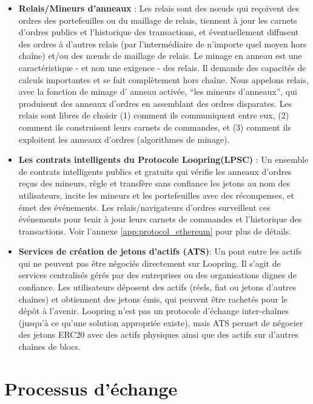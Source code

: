 \documentclass[UTF8,nofonts]{article}
\begin{document}
\begin{multicols}{2}
\begin{itemize}
\item \textbf{Relais/Mineurs d'anneaux} : Les relais sont des nœuds qui reçoivent des ordres des portefeuilles ou du maillage de relais, tiennent à jour les carnets d'ordres publics et l'historique des transactions, et éventuellement diffusent des ordres à d'autres relais (par l'intermédiaire de n’importe quel moyen hors chaîne) et/ou des nœuds de maillage de relais. Le minage en anneau est une caractéristique - et non une exigence - des relais. Il demande des capacités de calculs importantes et se fait complètement hors chaîne. Nous appelons relais, avec la fonction de minage d’ anneau activée, \enquote{les mineurs d’anneaux}, qui produisent des anneaux d'ordres en assemblant des ordres disparates. Les relais sont libres de choisir (1) comment ils communiquent entre eux, (2) comment ils construisent leurs carnets de commandes, et (3) comment ils exploitent les anneaux d'ordres (algorithmes de minage).

\item \textbf{Les contrats intelligents du Protocole Loopring(LPSC)} : Un ensemble de contrats intelligents publics et gratuits qui vérifie les anneaux d’ordres reçus des mineurs, règle et transfère sans confiance les jetons au nom des utilisateurs, incite les mineurs et les portefeuilles avec des récompenses, et émet des événements. Les relais/navigateurs d’ordres surveillent  ces événements pour tenir à jour leurs carnets de commandes et l'historique des transactions. Voir l'annexe \ref{app:protocol_ethereum} pour plus de détails.

\item \textbf{Services de création de jetons d'actifs (ATS)}: Un pont entre les actifs qui ne peuvent pas être négociés directement sur Loopring. Il s'agit de services centralisés gérés par des entreprises ou des organisations dignes de confiance. Les utilisateurs déposent des actifs (réels, fiat ou jetons d'autres chaînes) et obtiennent des jetons émis, qui peuvent être rachetés pour le dépôt à l'avenir. Loopring n'est pas un protocole d'échange inter-chaînes (jusqu'à ce qu'une solution appropriée existe), mais ATS permet de négocier des jetons ERC20 \cite{ERC20} avec des actifs physiques ainsi que des actifs sur d'autres chaînes de blocs.

\end{itemize}


\section{Processus d'échange\label{sec:process}}




\end{multicols}
\end{document}
